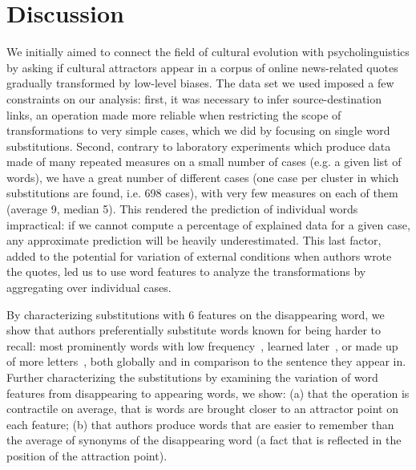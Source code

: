 \section{Discussion}

\begin{new}

We initially aimed to connect the field of cultural evolution with psycholinguistics by asking if cultural attractors appear in a corpus of online news-related quotes gradually transformed by low-level biases.
The data set we used imposed a few constraints on our analysis:
first, it was necessary to infer source-destination links, an operation made more reliable when restricting the scope of transformations to very simple cases, which we did by focusing on single word substitutions.
Second, contrary to laboratory experiments which produce data made of many repeated measures on a small number of cases (\hbox{e.g.} a given list of words), we have a great number of different cases (one case per cluster in which substitutions are found, \hbox{i.e.} 698 cases), with very few measures on each of them (average 9, median 5).
This rendered the prediction of individual words impractical: if we cannot compute a percentage of explained data for a given case, any approximate prediction will be heavily underestimated.
This last factor, added to the potential for variation of external conditions when authors wrote the quotes, led us to use word features to analyze the transformations by aggregating over individual cases.

By characterizing substitutions with 6 features on the disappearing word, we show that authors preferentially substitute words known for being harder to recall:
most prominently words with low frequency~\citep{gregg_word_1976}, learned later~\citep{dewhurst_separate_1998}, or made up of more letters~\citep{nickels_dissociating_2004}, both globally and in comparison to the sentence they appear in.
Further characterizing the substitutions by examining the variation of word features from disappearing to appearing words, we show:
(a) that the operation is contractile on average, that is words are brought closer to an attractor point on each feature;
(b) that authors produce words that are easier to remember than the average of synonyms of the disappearing word (a fact that is reflected in the position of the attraction point).


\end{new}

